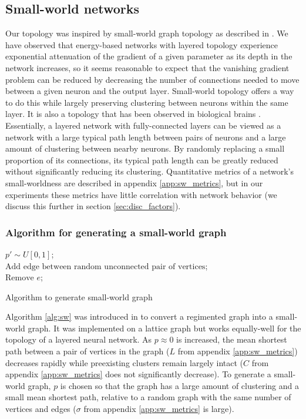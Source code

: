 \documentclass[format=sigconf]{acmart}
\begin{document}
\subsection{Small-world networks}
\label{sec:sw_background}

Our topology was inspired by small-world graph topology as described in \cite{watts98}. We have observed that energy-based networks with layered topology experience exponential attenuation of the gradient of a given parameter as its depth in the network increases, so it seems reasonable to expect that the vanishing gradient problem can be reduced by decreasing the number of connections needed to move between a given neuron and the output layer. Small-world topology offers a way to do this while largely preserving clustering between neurons within the same layer. It is also a topology that has been observed in biological brains \cite{bullmore2009}. Essentially, a layered network with fully-connected layers can be viewed as a network with a large typical path length between pairs of neurons and a large amount of clustering between nearby neurons. By randomly replacing a small proportion of its connections, its typical path length can be greatly reduced without significantly reducing its clustering. Quantitative metrics of a network's small-worldness are described in appendix \ref{app:sw_metrics}, but in our experiments these metrics have little correlation with network behavior (we discuss this further in section \ref{sec:disc_factors}).

\subsubsection{Algorithm for generating a small-world graph}
\label{sec:sw_algorithm}


\begin{algorithm}
\DontPrintSemicolon
{}
{
	$p'\sim U[0,1]$;\\
	{
		$\text{Add edge between random unconnected pair of vertices}$;\\
		$\text{Remove }e$;
	}
}

\caption{Algorithm to generate small-world graph}
\label{alg:sw}
\end{algorithm}


Algorithm \ref{alg:sw} was introduced in \cite{watts98} to convert a regimented graph into a small-world graph. It was implemented on a lattice graph but works equally-well for the topology of a layered neural network. As $p\approx 0$ is increased, the mean shortest path between a pair of vertices in the graph ($L$ from appendix \ref{app:sw_metrics}) decreases rapidly while preexisting clusters remain largely intact ($C$ from appendix \ref{app:sw_metrics} does not significantly decrease). To generate a small-world graph, $p$ is chosen so that the graph has a large amount of clustering and a small mean shortest path, relative to a random graph with the same number of vertices and edges ($\sigma$ from appendix \ref{app:sw_metrics} is large).
\end{document}
